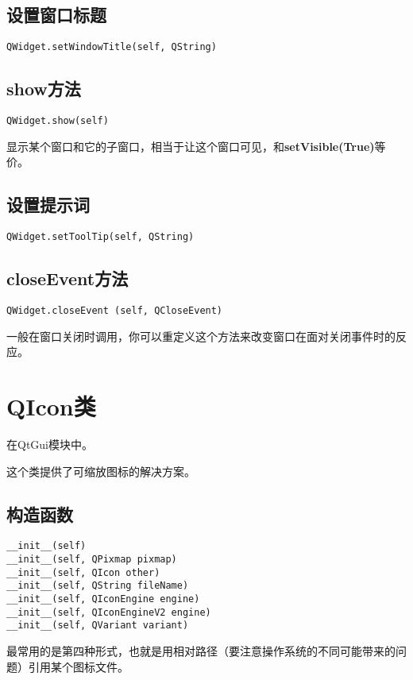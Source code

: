 \documentclass[12pt,oneside]{book}
\begin{document}
\begin{common-format}
\subsection{设置窗口标题}
\begin{Verbatim}
QWidget.setWindowTitle(self, QString)
\end{Verbatim}


\subsection{show方法}
\begin{Verbatim}
QWidget.show(self)
\end{Verbatim}
显示某个窗口和它的子窗口，相当于让这个窗口可见，和\textbf{setVisible(True)}等价。

\subsection{设置提示词}
\begin{Verbatim}
QWidget.setToolTip(self, QString)
\end{Verbatim}

\subsection{closeEvent方法}
\begin{Verbatim}
QWidget.closeEvent (self, QCloseEvent)
\end{Verbatim}
一般在窗口关闭时调用，你可以重定义这个方法来改变窗口在面对关闭事件时的反应。



\section{QIcon类}
在QtGui模块中。

这个类提供了可缩放图标的解决方案。

\subsection{构造函数}
\begin{Verbatim}
__init__(self)
__init__(self, QPixmap pixmap)
__init__(self, QIcon other)
__init__(self, QString fileName)
__init__(self, QIconEngine engine)
__init__(self, QIconEngineV2 engine)
__init__(self, QVariant variant)
\end{Verbatim}

最常用的是第四种形式，也就是用相对路径（要注意操作系统的不同可能带来的问题）引用某个图标文件。



\end{common-format}
\end{document}
